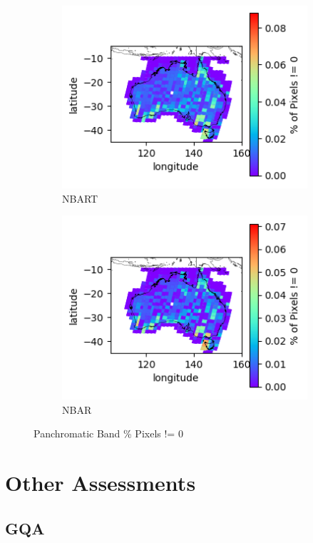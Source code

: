 \documentclass[a4paper]{article}
\begin{document}
      \begin{figure}[h!]
        \centering
          \begin{subfigure}[l]{.4\linewidth}
            \hspace{-32mm}
            \includegraphics[scale=0.9]{plots/nbart/nbart_panchromatic-PercentDifferent.png}
            \caption{NBART}
          \end{subfigure}
%
          \begin{subfigure}[r]{.4\linewidth}
            \includegraphics[scale=0.9]{plots/nbar/nbar_panchromatic-PercentDifferent.png}
            \caption{NBAR}
          \end{subfigure}
        \caption{Panchromatic Band \% Pixels != 0}\label{figure:22}
      \end{figure}

  \clearpage

  \section{Other Assessments}

    \subsection{GQA}
\end{document}
